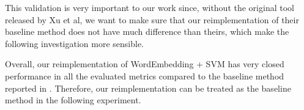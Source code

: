 This validation  is  very important to our work since, without the original tool released by Xu et al,
we want to make sure that our reimplementation of their baseline method does not have much difference
than theirs, which make the following investigation more sensible.

\begin{lesson}
Overall, our reimplementation of WordEmbedding + SVM
has very closed performance in all the evaluated metrics 
 compared to the baseline method reported in \cite{xu2016predicting}.
Therefore, our reimplementation can be treated as the baseline method in the following
experiment.
\end{lesson}